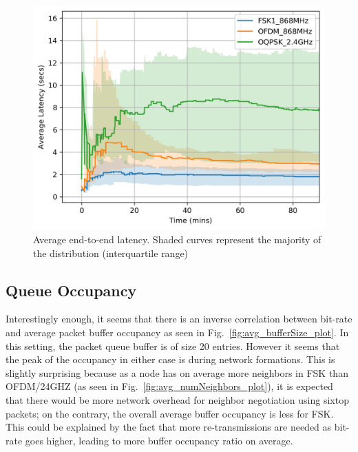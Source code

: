 \documentclass[journal]{IEEEtran}
\begin{document}
\begin{figure}
	\centering
	\includegraphics[width=0.90\columnwidth]{avg_latency_plot}
	\caption{Average end-to-end latency. Shaded curves represent the majority of the distribution (interquartile range)}
    \label{fig:avg_latency_plot}
\end{figure}

\subsection{Queue Occupancy}
\label{sec:queue}


Interestingly enough, it seems that there is an inverse correlation between bit-rate and average packet buffer occupancy as seen in Fig.~\ref{fig:avg_bufferSize_plot}. 
In this setting, the packet queue buffer is of size 20 entries. 
However it seems that the peak of the occupancy in either case is during network formations. 
This is slightly surprising because as a node has on average more neighbors in FSK than OFDM/24GHZ (as seen in Fig.~\ref{fig:avg_numNeighbors_plot}), it is expected that there would be more network overhead for neighbor negotiation using sixtop packets; on the contrary, the overall average buffer occupancy is less for FSK. 
This could be explained by the fact that more re-transmissions are needed as bit-rate goes higher, leading to more buffer occupancy ratio on average. 
\end{document}
